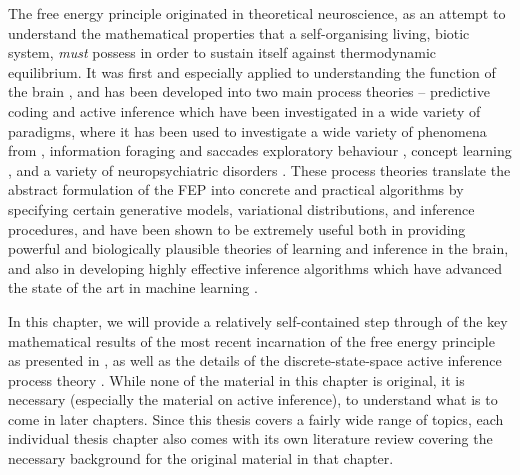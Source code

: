 The free energy principle originated in theoretical neuroscience, as an attempt to understand the mathematical properties that a self-organising living, biotic system, \emph{must} possess in order to sustain itself against thermodynamic equilibrium. It was first and especially applied to understanding the function of the brain \citep{friston2006free,friston2010action,friston2012history}, and has been developed into two main process theories -- predictive coding \citep{rao1999predictive,friston2003learning,friston2005theory,friston2008hierarchical} and active inference \citep{friston2009reinforcement,friston2012active,friston2015active,friston2017process,friston2018deep,da2020active} which have been investigated in a wide variety of paradigms, where it has been used to investigate a wide variety of phenomena from \citep{friston2014anatomy,friston2015knowing,friston2015active}, information foraging and saccades \citep{parr2017uncertainty,parr2018active,parr2019computational} exploratory behaviour \citep{schwartenbeck2013exploration,friston2015active,friston2017curiosity,friston2020sophisticated}, concept learning \citep{schwartenbeck_computational_2019}, and a variety of neuropsychiatric disorders \citep{lawson2014aberrant,adams2012smooth,mirza2019impulsivity,cullen2018active}. These process theories translate the abstract formulation of the FEP into concrete and practical algorithms by specifying certain generative models, variational distributions, and inference procedures, and have been shown to be extremely useful both in providing powerful and biologically plausible theories of learning and inference in the brain, and also in developing highly effective inference algorithms which have advanced the state of the art in machine learning \citep{parr2019neuronal,millidge_deep_2019,tschantz2020reinforcement,millidge2020relationship}. 

In this chapter, we will provide a relatively self-contained step through of the key mathematical results of the most recent incarnation of the free energy principle as presented in \citep{friston2019particularphysics, parr2020Markov}, as well as the details of the discrete-state-space active inference process theory \citep{friston2015active,da2020active}. While none of the material in this chapter is original, it is necessary (especially the material on active inference), to understand what is to come in later chapters. Since this thesis covers a fairly wide range of topics, each individual thesis chapter also comes with its own literature review covering the necessary background for the original material in that chapter.

